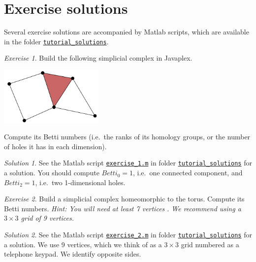 \documentclass[amscd, amssymb, verbatim]{amsart}[12pt]
\theoremstyle{remark}
\theoremstyle{remark}
\newtheorem{exerciseSol}{Exercise}
\theoremstyle{remark}
\newtheorem*{solution}{Solution}
\begin{document}
\section{Exercise solutions}\label{A:solutions}

Several exercise solutions are accompanied by Matlab scripts, which are available in the folder \href{https://github.com/appliedtopology/javaplex/tree/master/src/matlab/for_distribution/tutorial_solutions}{\texttt{tutorial\_solutions}}.

\begin{exerciseSol}
Build the following simplicial complex in Javaplex.
\begin{center}
\includegraphics[width=2in]{smallSimplicialComplex.png}
\end{center}
Compute its Betti numbers (i.e.\ the ranks of its homology groups, or the number of holes it has in each dimension).
\end{exerciseSol}

\begin{solution}
See the Matlab script \href{https://github.com/appliedtopology/javaplex/tree/master/src/matlab/for_distribution/tutorial_solutions/exercise_1.m}{\texttt{exercise\_1.m}} in folder \href{https://github.com/appliedtopology/javaplex/tree/master/src/matlab/for_distribution/tutorial_solutions}{\texttt{tutorial\_solutions}} for a solution. You should compute $Betti_0=1$, i.e.\ one connected component, and $Betti_2=1$, i.e.\ two 1-dimensional holes.
\end{solution}

\begin{exerciseSol}
Build a simplicial complex homeomorphic to the torus. Compute its Betti numbers. {\em Hint: You will need at least 7 vertices} \citep[page 107]{Hatcher}{\em . We recommend using a $3\times 3$ grid of 9 vertices.}
\end{exerciseSol}

\begin{solution}
See the Matlab script \href{https://github.com/appliedtopology/javaplex/tree/master/src/matlab/for_distribution/tutorial_solutions/exercise_2.m}{\texttt{exercise\_2.m}} in folder \href{https://github.com/appliedtopology/javaplex/tree/master/src/matlab/for_distribution/tutorial_solutions}{\texttt{tutorial\_solutions}} for a solution. We use 9 vertices, which we think of as a $3 \times 3$ grid numbered as a telephone keypad. We identify opposite sides.
\end{solution}
\end{document}
